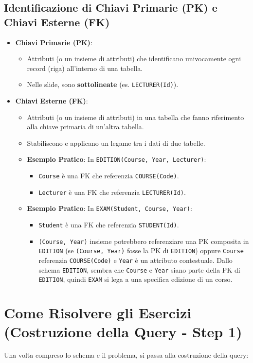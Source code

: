 \subsection{Identificazione di Chiavi Primarie (PK) e Chiavi Esterne (FK)}
\begin{itemize}
    \item \textbf{Chiavi Primarie (PK)}:
    \begin{itemize}
        \item Attributi (o un insieme di attributi) che identificano univocamente ogni record (riga) all'interno di una tabella.
        \item Nelle slide, sono \textbf{sottolineate} (es. \texttt{LECTURER(Id)}).
    \end{itemize}
    \item \textbf{Chiavi Esterne (FK)}:
    \begin{itemize}
        \item Attributi (o un insieme di attributi) in una tabella che fanno riferimento alla chiave primaria di un'altra tabella.
        \item Stabiliscono e applicano un legame tra i dati di due tabelle.
        \item \textbf{Esempio Pratico}: In \texttt{EDITION(Course, Year, Lecturer)}:
        \begin{itemize}
            \item \texttt{Course} è una FK che referenzia \texttt{COURSE(Code)}.
            \item \texttt{Lecturer} è una FK che referenzia \texttt{LECTURER(Id)}.
        \end{itemize}
        \item \textbf{Esempio Pratico}: In \texttt{EXAM(Student, Course, Year)}:
        \begin{itemize}
            \item \texttt{Student} è una FK che referenzia \texttt{STUDENT(Id)}.
            \item \texttt{(Course, Year)} insieme potrebbero referenziare una PK composita in \texttt{EDITION} (se \texttt{(Course, Year)} fosse la PK di \texttt{EDITION}) oppure \texttt{Course} referenzia \texttt{COURSE(Code)} e \texttt{Year} è un attributo contestuale. Dallo schema \texttt{EDITION}, sembra che \texttt{Course} e \texttt{Year} siano parte della PK di \texttt{EDITION}, quindi \texttt{EXAM} si lega a una specifica edizione di un corso.
        \end{itemize}
    \end{itemize}
\end{itemize}\section{Come Risolvere gli Esercizi (Costruzione della Query - Step 1)}
Una volta compreso lo schema e il problema, si passa alla costruzione della query:

